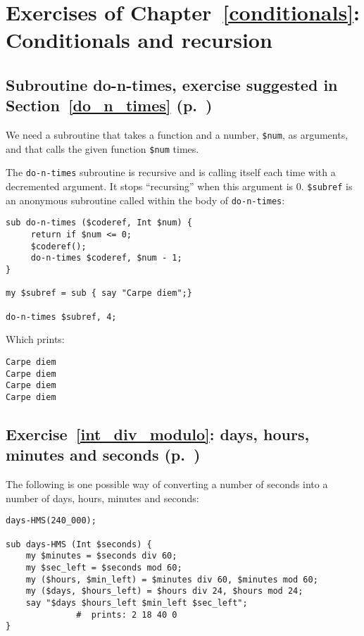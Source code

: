 \section{Exercises of Chapter~\ref{conditionals}: Conditionals and recursion}

\label{sol_do_n_times}

\subsection{Subroutine do-n-times, exercise suggested in Section~\ref{do_n_times} (p.~\pageref{do_n_times})}

We need a subroutine that takes a function 
and a number, {\tt \$num}, as arguments, and that calls
the given function {\tt \$num} times.

The {\tt do-n-times} subroutine is recursive and is 
calling itself each time with a decremented argument. It 
stops ``recursing'' when this argument is 0. \verb'$subref' is an anonymous subroutine called within the body of 
{\tt do-n-times}:

\begin{verbatim}
sub do-n-times ($coderef, Int $num) {
     return if $num <= 0;
     $coderef();
     do-n-times $coderef, $num - 1;
}

my $subref = sub { say "Carpe diem";}

do-n-times $subref, 4;
\end{verbatim}

Which prints:

\begin{verbatim}
Carpe diem
Carpe diem
Carpe diem
Carpe diem
\end{verbatim}

\subsection{Exercise~\ref{int_div_modulo}: days, hours, 
minutes and seconds (p.~\pageref{int_div_modulo})}
\label{sol_int_div_modulo}

The following is one possible way of converting a number 
of seconds into a number of days, hours, minutes and seconds:


\begin{verbatim}
days-HMS(240_000);

sub days-HMS (Int $seconds) {
    my $minutes = $seconds div 60;
    my $sec_left = $seconds mod 60;
    my ($hours, $min_left) = $minutes div 60, $minutes mod 60;
    my ($days, $hours_left) = $hours div 24, $hours mod 24;
    say "$days $hours_left $min_left $sec_left"; 
              #  prints: 2 18 40 0
}
\end{verbatim}

